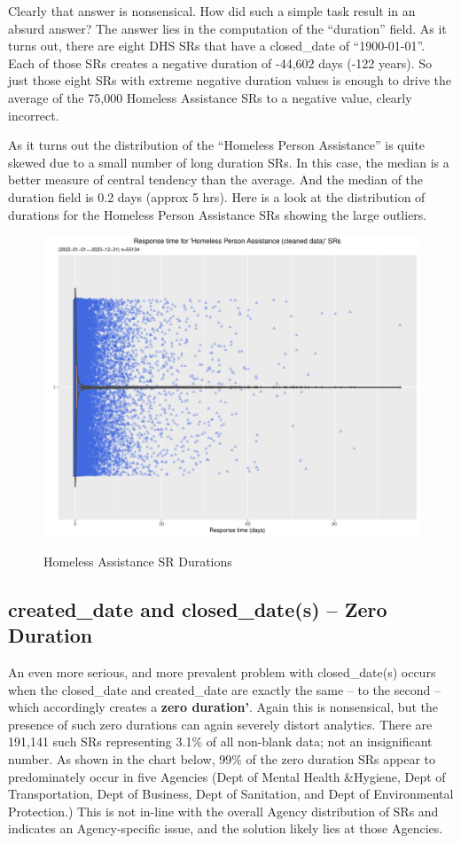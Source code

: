 \documentclass[12pt, titlepage]{article}
\begin{document}
{		Clearly that answer is nonsensical. How did such a simple task result in an absurd answer? The answer lies in the computation of the
		``duration'' field. As it turns out, there are eight DHS SRs that have a closed\_date of ``1900-01-01''. Each of those SRs creates a 
		negative duration of -44,602 days (-122 years). So just those eight SRs with extreme negative duration values is enough to drive
		the average of the 75,000 Homeless Assistance SRs to a negative value, clearly incorrect.
		
		As it turns out the distribution of the ``Homeless Person Assistance'' is quite skewed due to a small number of long duration
		SRs. In this case, the median is a better measure of central tendency than the average. And the median of the duration
		field is  0.2 days (approx 5 hrs). Here is a look at the distribution of durations for the Homeless Person Assistance SRs showing
		the large outliers. 
		
		\begin{figure}[tbp]
		 	 \centering
		 	 \caption{Homeless Assistance SR Durations}
			  \includegraphics[width = \textwidth]{homeless_response_time_clean.pdf}
			  \label{fig:homeless}
		\end{figure}
		
	\subsection{created\_date and closed\_date(s) --  Zero Duration}		
	An even more serious, and more prevalent problem with closed\_date(s) occurs when the closed\_date and created\_date
	are exactly the same -- to the second -- which accordingly creates a \textbf{zero duration'}. Again this is nonsensical, but the
	presence of such zero durations can again severely distort analytics. There are 191,141 such SRs representing 3.1\% of all 
	non-blank data; not an insignificant number. As shown in the chart below, 99\% of the zero duration SRs appear to predominately
	occur in five Agencies (Dept of Mental Health \&Hygiene, Dept of Transportation, Dept of Business, Dept of Sanitation,
	and Dept of Environmental Protection.) This is not in-line with the overall Agency distribution of SRs and indicates an
	Agency-specific issue, and the solution likely lies at those Agencies.
	
}
\end{document}
